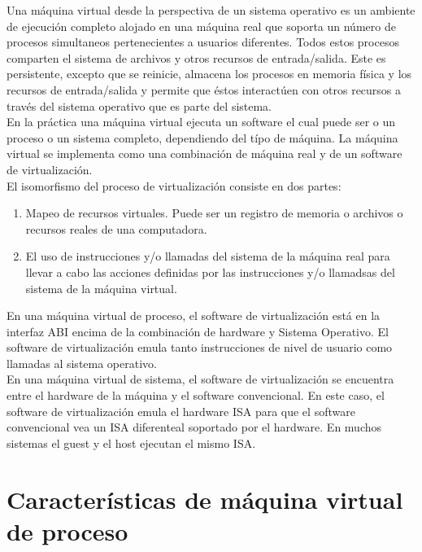 \documentclass[10pt,a4paper,spanish]{report}
\begin{document}
  \noindent
  Una máquina virtual desde la perspectiva de un sistema operativo es un ambiente de ejecución completo alojado en una máquina real que soporta un número de procesos simultaneos pertenecientes a usuarios diferentes. Todos estos procesos comparten el sistema de archivos y otros recursos de entrada/salida. Este es persistente, excepto que se reinicie, almacena los procesos en memoria física y los recursos de entrada/salida y permite que éstos interactúen con otros recursos a través del sistema operativo que es parte del sistema. \\

  \noindent
  En la práctica una máquina virtual ejecuta un software el cual puede ser o un proceso o un sistema completo, dependiendo del típo de máquina. La máquina virtual se implementa como una combinación de máquina real y de un software de virtualización.\\

  \noindent
  El isomorfismo del proceso de virtualización consiste en dos partes:

  \begin{enumerate}
    \item Mapeo de recursos virtuales. Puede ser un registro de memoria o archivos o recursos reales de una computadora.
    \item El uso de instrucciones y/o llamadas del sistema de la máquina real para llevar a cabo las acciones definidas por las instrucciones y/o llamadsas del sistema de la máquina virtual.
  \end{enumerate}

  \noindent
  En una máquina virtual de proceso, el software de virtualización está en la interfaz ABI encima de la combinación de hardware y Sistema Operativo. El software de virtualización emula tanto instrucciones de nivel de usuario como llamadas al sistema operativo. \\

  \noindent
  En una máquina virtual de sistema, el software de virtualización se encuentra entre el hardware de la máquina y el software convencional. En este caso, el software de virtualización emula el hardware ISA para que el software convencional vea un ISA diferenteal soportado por el hardware. En muchos sistemas el guest y el host ejecutan el mismo ISA.

  \section{Características de máquina virtual de proceso}
\end{document}
